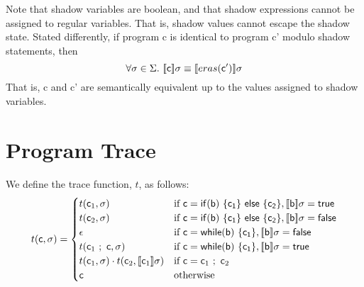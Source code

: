 \documentclass[]{article}
\newcommand{\lsyn}{[\![}
\newcommand{\rsyn}{]\!]}
\begin{document}
Note that shadow variables are boolean, and that shadow expressions cannot be assigned to regular variables. That is, shadow values cannot escape the shadow state. Stated differently, if program {\sf c} is identical to program {\sf c'} modulo shadow statements, then
$$
	\forall \sigma \in \Sigma.\ \lsyn {\sf c} \rsyn \sigma \equiv \lsyn {\sf \instrEras(c')} \rsyn \sigma
$$
That is, {\sf c} and {\sf c'} are semantically equivalent up to the values assigned to shadow variables.

%
%


\section{Program Trace}

We define the trace function, $t$, as follows:
\[ 
t({\sf c},\sigma) = \begin{cases} 
t({\sf c}_1,\sigma) &
	\mbox{if } {\sf c}={\sf if (b)\ \{ c_1 \}\ else\ \{ c_2 \}},\lsyn {\sf b} \rsyn\sigma = {\sf true} \\ 
t({\sf c}_2,\sigma) &
	\mbox{if } {\sf c}={\sf if (b)\ \{ c_1 \}\ else\ \{ c_2 \}},\lsyn {\sf b} \rsyn\sigma = {\sf false} \\ 
\epsilon &
	\mbox{if } {\sf c}={\sf while (b)\ \{ c_1 \}},\lsyn {\sf b} \rsyn\sigma = {\sf false} \\ 
t({\sf c}_1\ ;\ {\sf c},\sigma) &
	\mbox{if } {\sf c}={\sf while (b)\ \{ c_1 \}},\lsyn {\sf b} \rsyn\sigma = {\sf true} \\ 
t({\sf c}_1,\sigma) \cdot t({\sf c}_2,\lsyn {\sf c}_1 \rsyn \sigma) &
	\mbox{if } {\sf c}={\sf c}_1\ ;\ {\sf c}_2 \\ 
{\sf c} & 
	\mbox{otherwise}
\end{cases}
\]
\end{document}
